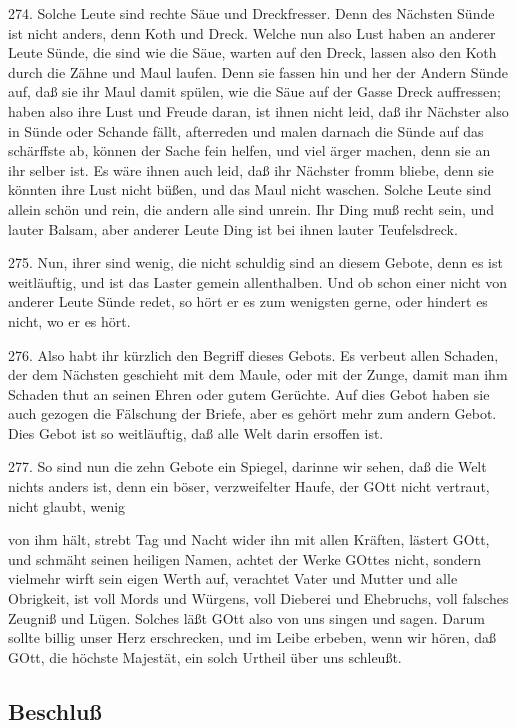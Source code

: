 274. Solche Leute sind rechte Säue und Dreckfresser. Denn des Nächsten Sünde ist nicht anders, denn Koth und Dreck. Welche nun also Lust haben an anderer Leute Sünde, die sind wie die Säue, warten auf den Dreck, lassen also den Koth durch die Zähne und Maul laufen. Denn sie fassen hin und her der Andern Sünde auf, daß sie ihr Maul damit spülen, wie die Säue auf der Gasse Dreck auffressen; haben also ihre Lust und Freude daran, ist ihnen nicht leid, daß ihr Nächster also in Sünde oder Schande fällt, afterreden und malen darnach die Sünde auf das schärffste ab, können der Sache fein helfen, und viel ärger machen, denn sie an ihr selber ist. Es wäre ihnen auch leid, daß ihr Nächster fromm bliebe, denn sie könnten ihre Lust nicht büßen, und das Maul nicht waschen. Solche Leute sind allein schön und rein, die andern alle sind unrein. Ihr Ding muß recht sein, und lauter Balsam, aber anderer Leute Ding ist bei ihnen lauter Teufelsdreck.

275. Nun, ihrer sind wenig, die nicht schuldig sind an diesem Gebote, denn es ist weitläuftig, und ist das Laster gemein allenthalben. Und ob schon einer nicht von anderer Leute Sünde redet, so hört er es zum wenigsten gerne, oder hindert es nicht, wo er es hört.

276. Also habt ihr kürzlich den Begriff dieses Gebots. Es verbeut allen Schaden, der dem Nächsten geschieht mit dem Maule, oder mit der Zunge, damit man ihm Schaden thut an seinen Ehren oder gutem Gerüchte. Auf dies Gebot haben sie auch gezogen die Fälschung der Briefe, aber es gehört mehr zum andern Gebot. Dies Gebot ist so weitläuftig, daß alle Welt darin ersoffen ist.

277. So sind nun die zehn Gebote ein Spiegel, darinne wir sehen, daß die Welt nichts anders ist, denn ein böser, verzweifelter Haufe, der GOtt nicht vertraut, nicht glaubt, wenig

von ihm hält, strebt Tag und Nacht wider ihn mit allen Kräften, lästert GOtt, und schmäht seinen heiligen Namen, achtet der Werke GOttes nicht, sondern vielmehr wirft sein eigen Werth auf, verachtet Vater und Mutter und alle Obrigkeit, ist voll Mords und Würgens, voll Dieberei und Ehebruchs, voll falsches Zeugniß und Lügen. Solches läßt GOtt also von uns singen und sagen. Darum sollte billig unser Herz erschrecken, und im Leibe erbeben, wenn wir hören, daß GOtt, die höchste Majestät, ein solch Urtheil über uns schleußt.

\subsection{Beschluß}

